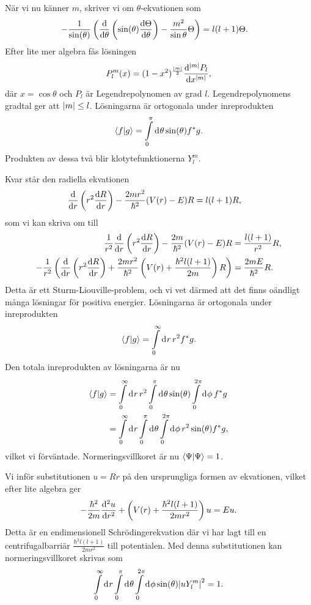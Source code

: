 När vi nu känner $m$, skriver vi om $\theta$-ekvationen som
\begin{align*}
	-\frac{1}{\sin(\theta)}\left(\dv{\theta}\left(\sin(\theta)\dv{\Theta}{\theta}\right) - \frac{m^{2}}{\sin{\theta}}\Theta\right) &= l(l + 1)\Theta.
\end{align*}
Efter lite mer algebra fås lösningen
\begin{align*}
	P_{l}^{m}(x) = (1 - x^{2})^{\frac{\abs{m}}{2}}\dv[\abs{m}]{P_{l}}{x},
\end{align*}
där $x = \cos{\theta}$ och $P_{l}$ är Legendrepolynomen av grad $l$. Legendrepolynomens gradtal ger att $\abs{m}\leq l$. Lösningarna är ortogonala under inreprodukten
\begin{align*}
	\braket{f}{g} = \int\limits_{0}^{\pi}\dd[]{\theta}\sin(\theta)f^{*}g.
\end{align*}
Produkten av dessa två blir klotytefunktionerna $Y_{l}^{m}$.

Kvar står den radiella ekvationen
\begin{align*}
	\dv{r}\left(r^{2}\dv{R}{r}\right) - \frac{2mr^{2}}{\hbar^{2}}(V(r) - E)R &= l(l + 1)R,
\end{align*}
som vi kan skriva om till
\begin{align*}
	\frac{1}{r^{2}}\dv{r}\left(r^{2}\dv{R}{r}\right) - \frac{2m}{\hbar^{2}}(V(r) - E)R &= \frac{l(l + 1)}{r^{2}}R, \\
	-\frac{1}{r^{2}}\left(\dv{r}\left(r^{2}\dv{R}{r}\right) + \frac{2mr^{2}}{\hbar^{2}}\left(V(r) + \frac{\hbar^{2}l(l + 1)}{2m}\right)R\right) &= \frac{2mE}{\hbar^{2}}R.
\end{align*}
Detta är ett Sturm-Liouville-problem, och vi vet därmed att det finns oändligt många lösningar för positiva energier. Lösningarna är ortogonala under inreprodukten
\begin{align*}
	\braket{f}{g} = \int\limits_{0}^{\infty}\dd[]{r}r^{2}f^{*}g.
\end{align*}
Den totala inreprodukten av lösningarna är nu
\begin{align*}
	\braket{f}{g} &= \int\limits_{0}^{\infty}\dd[]{r}r^{2}\int\limits_{0}^{\pi}\dd[]{\theta}\sin(\theta)\int\limits_{0}^{2\pi}\dd[]{\phi}f^{*}g \\
	              &= \int\limits_{0}^{\infty}\dd[]{r}\int\limits_{0}^{\pi}\dd[]{\theta}\int\limits_{0}^{2\pi}\dd[]{\phi}r^{2}\sin(\theta)f^{*}g,
\end{align*}
vilket vi förväntade. Normeringsvillkoret är nu $\braket{\Psi} = 1$.

Vi inför substitutionen $u = Rr$ på den ursprungliga formen av ekvationen, vilket efter lite algebra ger
\begin{align*}
	-\frac{\hbar^{2}}{2m}\dv[2]{u}{r} + \left(V(r) + \frac{\hbar^{2}l(l + 1)}{2mr^{2}}\right)u = Eu.
\end{align*}
Detta är en endimensionell Schrödingerekvation där vi har lagt till en centrifugalbarriär $\frac{\hbar^{2}l(l + 1)}{2mr^{2}}$ till potentialen. Med denna substitutionen kan normeringsvillkoret skrivas som
\begin{align*}
	\int\limits_{0}^{\infty}\dd[]{r}\int\limits_{0}^{\pi}\dd[]{\theta}\int\limits_{0}^{2\pi}\dd[]{\phi}\sin(\theta)\abs{uY_{l}^{m}}^{2} = 1.
\end{align*}

